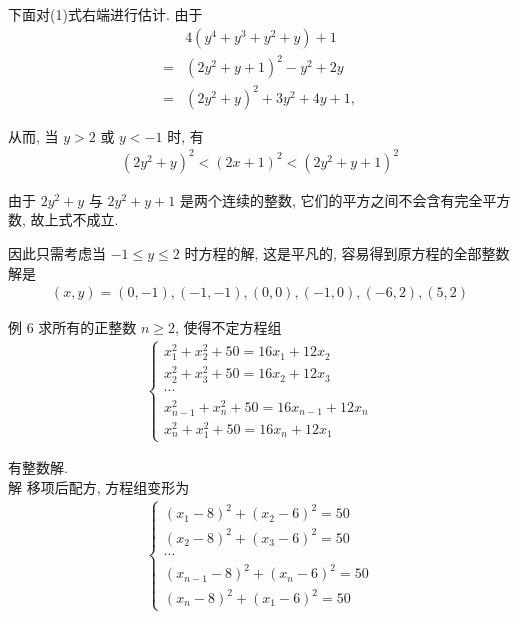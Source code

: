 	下面对(1)式右端进行估计. 由于\begin{align}
		  & 4\left(y^{4}+y^{3}+y^{2}+y\right)+1       \\
		= & \left(2 y^{2}+y+1\right)^{2}-y^{2}+2 y    \\
		= & \left(2 y^{2}+y\right)^{2}+3 y^{2}+4 y+1,
	\end{align}

	从而, 当 $y>2$ 或 $y<-1$ 时, 有
\begin{align*}
		\left(2 y^{2}+y\right)^{2}<(2 x+1)^{2}<\left(2 y^{2}+y+1\right)^{2}
	\end{align*}

	由于 $2 y^{2}+y$ 与 $2 y^{2}+y+1$ 是两个连续的整数, 它们的平方之间不会含有完全平方数, 故上式不成立.

	因此只需考虑当 $-1 \leqslant y \leqslant 2$ 时方程的解, 这是平凡的, 容易得到原方程的全部整数解是
\begin{align*}
		(x, y)=(0,-1),(-1,-1),(0,0),(-1,0),(-6,2),(5,2)
	\end{align*}

	例 6 求所有的正整数 $n \geqslant 2$, 使得不定方程组
\begin{align*}
		\left\{\begin{array}{c}
			       x_{1}^{2}+x_{2}^{2}+50=16 x_{1}+12 x_{2}     \\
			       x_{2}^{2}+x_{3}^{2}+50=16 x_{2}+12 x_{3}     \\
			       \cdots                                       \\
			       x_{n-1}^{2}+x_{n}^{2}+50=16 x_{n-1}+12 x_{n} \\
			       x_{n}^{2}+x_{1}^{2}+50=16 x_{n}+12 x_{1}
		       \end{array}\right.
	\end{align*}

	有整数解.\\
	解 移项后配方, 方程组变形为
\begin{align*}
		\left\{\begin{array}{c}
			       \left(x_{1}-8\right)^{2}+\left(x_{2}-6\right)^{2}=50   \\
			       \left(x_{2}-8\right)^{2}+\left(x_{3}-6\right)^{2}=50   \\
			       \cdots                                                 \\
			       \left(x_{n-1}-8\right)^{2}+\left(x_{n}-6\right)^{2}=50 \\
			       \left(x_{n}-8\right)^{2}+\left(x_{1}-6\right)^{2}=50
		       \end{array}\right.
	\end{align*}

